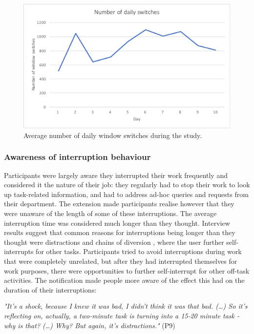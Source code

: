 \begin{figure}
\centering
\centerline{\includegraphics[scale=1]{images/ch56/ch56_MTNrSwitches.pdf}}
\caption{Average number of daily window switches during the study.}
\label{fig:ch56-7_mtnrswitches}
\end{figure}

\subsubsection{Awareness of interruption behaviour}
Participants were largely aware they interrupted their work frequently and considered it the nature of their job: they regularly had to stop their work to look up task-related information, and had to address ad-hoc queries and requests from their department. The extension made participants realise however that they were unaware of the length of some of these interruptions. The average interruption time was considered much longer than they thought. 
Interview results suggest that common reasons for interruptions being longer than they thought were distractions and chains of diversion \citep{Hanrahan2015, Iqbal2007}, where the user further self-interrupts for other tasks. Participants tried to avoid interruptions during work that were completely unrelated, but after they had interrupted themselves for work purposes, there were opportunities to further self-interrupt for other off-task activities. The notification made people more aware of the effect this had on the duration of their interruptions:

\textit{"It's a shock, because I knew it was bad, I didn't think it was that bad. (…) So it's reflecting on, actually, a two-minute task is turning into a 15-20 minute task - why is that? (…) Why? But again, it's distractions."} (P9)

